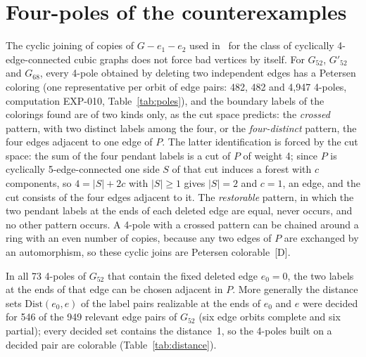 \documentclass[11pt]{article}
\theoremstyle{definition}
\theoremstyle{remark}
\newcommand{\PG}{P}
\newcommand{\Gmain}{G_{112}}
\newcommand{\Gsym}{H_{112}}
\newcommand{\Gfty}{G_{52}}
\newcommand{\Gftyb}{G'_{52}}
\newcommand{\Gsix}{G_{68}}
\newcommand{\dd}{\textup{[D]}}
\begin{document}
\section{Four-poles of the counterexamples}\label{sec:poles}

The cyclic joining of copies of $G - e_1 - e_2$ used in~\cite{MMM2021} for the class of cyclically
4-edge-connected cubic graphs does not force bad vertices by itself. For $\Gfty$, $\Gftyb$ and
$\Gsix$, every 4-pole obtained by deleting two independent edges has a Petersen coloring (one
representative per orbit of edge pairs: 482, 482 and 4{,}947 4-poles, computation EXP-010,
Table~\ref{tab:poles}), and the boundary labels of the colorings found are of two kinds only, as
the cut space predicts: the \emph{crossed} pattern, with two distinct labels among the four, or the
\emph{four-distinct} pattern, the four edges adjacent to one edge of $\PG$. The latter identification
is forced by the cut space: the sum of the four pendant labels is a cut of $\PG$ of weight 4; since $\PG$
is cyclically 5-edge-connected one side $S$ of that cut induces a forest with $c$ components, so
$4 = |S| + 2c$ with $|S| \ge 1$ gives $|S| = 2$ and $c = 1$, an edge, and the cut consists of the four edges
adjacent to it. The \emph{restorable}
pattern, in which the two pendant labels at the ends of each deleted edge are equal, never occurs,
and no other pattern occurs. A 4-pole with a crossed pattern can be chained around
a ring with an even number of copies, because any two edges of $\PG$ are exchanged by an
automorphism, so these cyclic joins are Petersen colorable~\dd{}.

\begin{table}[htbp]\centering\footnotesize\setlength{\tabcolsep}{4pt}

\caption{4-poles $M(G; e_1, e_2)$ obtained by deleting two independent edges, one representative per
orbit of edge pairs under the listed automorphisms (computation EXP-010). The sweep of $\Gsym$
stopped at 540 of 2{,}324 representatives and that of $\Gmain$ was not run; the control $J_5$
has 28 representatives.}\label{tab:poles}
\end{table}

In all 73 4-poles of $\Gfty$ that contain the fixed deleted edge $e_0 = 0$, the two labels at the ends
of that edge can be chosen adjacent in $\PG$. More generally the distance sets
$\mathrm{Dist}(e_0, e)$ of the label pairs realizable at the ends of $e_0$ and $e$ were decided
for 546 of the 949 relevant edge pairs of $\Gfty$ (six edge orbits complete and six partial); every decided set contains the distance~1, so the 4-poles built on a decided pair are
colorable (Table~\ref{tab:distance}).
\end{document}
